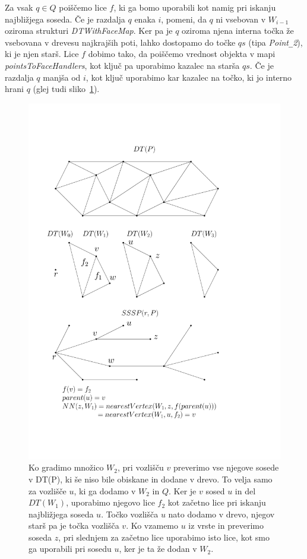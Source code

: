 \documentclass[a4paper, 12pt]{book}
\newcommand{\U}{\texttt{\_}}
\begin{document}
Za vsak $q\in Q$ poiščemo lice $f$, ki ga bomo uporabili kot namig pri iskanju najbližjega soseda. Če je razdalja $q$ enaka $i$, pomeni, da $q$ ni vsebovan v $W_{i-1}$ oziroma strukturi \textit{DTWithFaceMap}. Ker pa je $q$ oziroma njena interna točka že vsebovana v drevesu najkrajših poti, lahko dostopamo do točke $qs$ (tipa \textit{Point\U 2}), ki je njen starš.  Lice $f$ dobimo tako, da poiščemo vrednost objekta v mapi \textit{pointsToFaceHandlers}, kot ključ pa uporabimo kazalec na starša $qs$. Če je razdalja $q$ manjša od $i$, kot ključ uporabimo kar kazalec na točko, ki jo interno hrani $q$ (glej tudi sliko~\ref{pointsToFace}).

\begin{figure}[htp]
\centerline{\includegraphics[scale=0.6]{pics/pointsToFaceHandlers-all.pdf}}
\caption{Ko gradimo množico $W_2$, pri vozlišču $v$ preverimo vse njegove sosede v DT(P), ki še niso bile obiskane in dodane v drevo. To velja samo za vozlišče $u$, ki ga dodamo v $W_2$ in $Q$. Ker je $v$ sosed $u$ in del $DT(W_1)$, uporabimo njegovo lice $f_2$ kot začetno lice pri iskanju najbližjega soseda $u$. Točko vozlišča $u$ nato dodamo v drevo, njegov starš pa je točka vozlišča $v$. Ko vzamemo $u$ iz vrste in preverimo soseda $z$, pri slednjem za začetno lice uporabimo isto lice, kot smo ga uporabili pri sosedu $u$, ker je ta že dodan v $W_2$.}
\label{pointsToFace}
\end{figure}  
\end{document}
